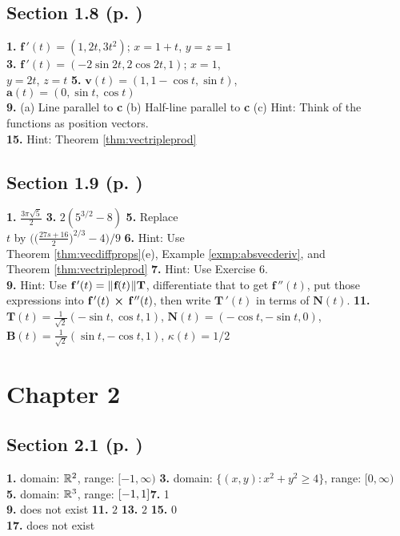 \begin{multicols}{2}
\subsection*{Section 1.8 (p. \pageref{sec1dot8})}
\textbf{1.} $\textbf{f}\,'(t) = (1,2t,3t^2)$; $x = 1 + t$, $y = z = 1$\\\textbf{3.} $\textbf{f}\,'(t) =
(-2\sin 2t,2\cos 2t,1)$; $x = 1$,\\$y = 2t$, $z = t$ \quad \textbf{5.} $\textbf{v}(t) = (1,1 - \cos t,\sin t)$,\\
$\textbf{a}(t) = (0,\sin t,\cos t)$\\\textbf{9.} (a) Line parallel to \textbf{c} \quad (b) Half-line parallel to
\textbf{c} \quad (c) Hint:  Think of the\\functions as position vectors.\\\textbf{15.} Hint: Theorem
\ref{thm:vectripleprod}
\subsection*{Section 1.9 (p. \pageref{sec1dot9})}
\textbf{1.} $\frac{3\pi \sqrt{5}}{2}$ \quad \textbf{3.} $2 (5^{3/2} - 8)$ \quad \textbf{5.} Replace\\$t$ by
$\biggl( \biggl( \frac{27s + 16}{2} \biggr)^{2/3} - 4 \biggr)\bigg/ 9$ \quad \textbf{6.} Hint: Use\\Theorem
\ref{thm:vecdiffprops}(e), Example \ref{exmp:absvecderiv}, and\\Theorem \ref{thm:vectripleprod} \quad \textbf{7.} Hint:
Use Exercise 6.\\\textbf{9.} Hint: Use $\textbf{f}\,'(t) = \lVert\mspace{1mu}\textbf{f}(t)\mspace{1mu}\rVert\textbf{T}$, differentiate that
to get $\textbf{f}\,''(t)$, put those expressions into $\textbf{f}\,'(t)\, \bm{\times} \,\textbf{f}\,''(t)$, then
write $\textbf{T}\,'(t)$ in terms of $\textbf{N}(t)$. \quad \textbf{11.} $\textbf{T}(t) = \frac{1}{\sqrt{2}}
(-\sin t,\cos t,1)$, $\textbf{N}(t) = (-\cos t,-\sin t,0)$, $\textbf{B}(t) = \frac{1}{\sqrt{2}}(\sin t,-\cos t,1)$,
$\kappa(t) = 1/2$
\section*{Chapter 2}
\subsection*{Section 2.1 (p. \pageref{sec2dot1})}
\textbf{1.} domain: $\mathbb{R}^{2}$, range: $\lbrack -1,\infty )$\quad
\textbf{3.} domain: $\lbrace (x,y): x^2 + y^2 \ge 4 \rbrace$, range: $\lbrack 0,\infty)$\\\textbf{5.} domain:
$\mathbb{R}^{3}$, range: $\lbrack -1,1 \rbrack$\quad\textbf{7.} 1\\\textbf{9.} does not exist\quad
\textbf{11.} $2$\quad
\textbf{13.} $2$\quad
\textbf{15.} $0$\\\textbf{17.} does not exist

\end{multicols}
